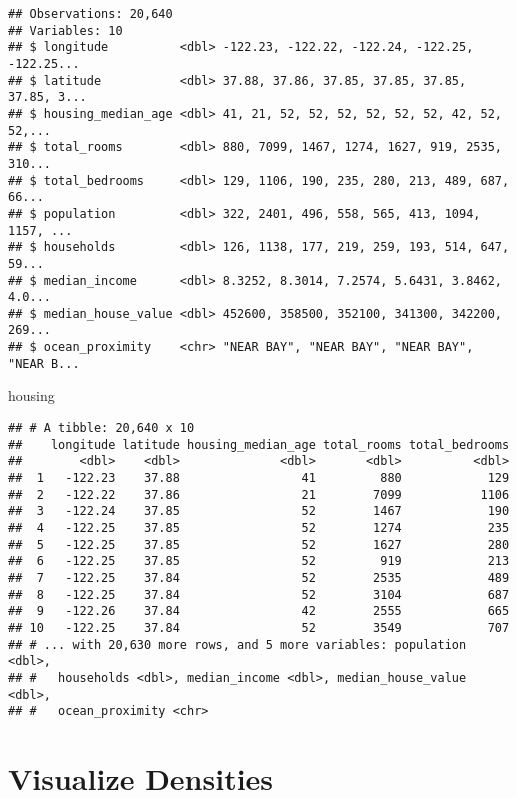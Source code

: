 \documentclass[]{book}
\newenvironment{Shaded}{\begin{snugshade}}{\end{snugshade}}
\newcommand{\NormalTok}[1]{#1}
\theoremstyle{definition}
\theoremstyle{definition}
\theoremstyle{definition}
\theoremstyle{remark}
\begin{document}
\begin{verbatim}
## Observations: 20,640
## Variables: 10
## $ longitude          <dbl> -122.23, -122.22, -122.24, -122.25, -122.25...
## $ latitude           <dbl> 37.88, 37.86, 37.85, 37.85, 37.85, 37.85, 3...
## $ housing_median_age <dbl> 41, 21, 52, 52, 52, 52, 52, 52, 42, 52, 52,...
## $ total_rooms        <dbl> 880, 7099, 1467, 1274, 1627, 919, 2535, 310...
## $ total_bedrooms     <dbl> 129, 1106, 190, 235, 280, 213, 489, 687, 66...
## $ population         <dbl> 322, 2401, 496, 558, 565, 413, 1094, 1157, ...
## $ households         <dbl> 126, 1138, 177, 219, 259, 193, 514, 647, 59...
## $ median_income      <dbl> 8.3252, 8.3014, 7.2574, 5.6431, 3.8462, 4.0...
## $ median_house_value <dbl> 452600, 358500, 352100, 341300, 342200, 269...
## $ ocean_proximity    <chr> "NEAR BAY", "NEAR BAY", "NEAR BAY", "NEAR B...
\end{verbatim}

\begin{Shaded}
\begin{Highlighting}[]
\NormalTok{housing}
\end{Highlighting}
\end{Shaded}

\begin{verbatim}
## # A tibble: 20,640 x 10
##    longitude latitude housing_median_age total_rooms total_bedrooms
##        <dbl>    <dbl>              <dbl>       <dbl>          <dbl>
##  1   -122.23    37.88                 41         880            129
##  2   -122.22    37.86                 21        7099           1106
##  3   -122.24    37.85                 52        1467            190
##  4   -122.25    37.85                 52        1274            235
##  5   -122.25    37.85                 52        1627            280
##  6   -122.25    37.85                 52         919            213
##  7   -122.25    37.84                 52        2535            489
##  8   -122.25    37.84                 52        3104            687
##  9   -122.26    37.84                 42        2555            665
## 10   -122.25    37.84                 52        3549            707
## # ... with 20,630 more rows, and 5 more variables: population <dbl>,
## #   households <dbl>, median_income <dbl>, median_house_value <dbl>,
## #   ocean_proximity <chr>
\end{verbatim}

\section{Visualize Densities}\label{visualize-densities}
\end{document}
